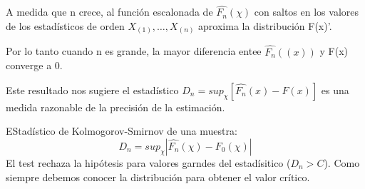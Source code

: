 A medida que n crece, al función escalonada de $\hat{F_n}(\chi)$ con saltos en los valores de los estadísticos de orden $X_{(1)},\dots,X_{(n)}$ aproxima la distribución F(x)'.

Por lo tanto cuando n es grande, la mayor diferencia entee $\hat{F_n}((x))$ y F(x) converge a 0.

Este resultado nos sugiere el estadístico $
D_n=sup_\chi[\hat{F_n}(x)-F(x)]
$ es una medida razonable de la precisión de la estimación.

EStadístico de Kolmogorov-Smirnov de una muestra:
\[
    D_n=sup_\chi|\hat{F_n}(\chi)-F_0(\chi)|
\]
El test rechaza la hipótesis para valores garndes del estadísitico ($D_n>C$).
Como siempre debemos conocer la distribución para obtener el valor crítico.
